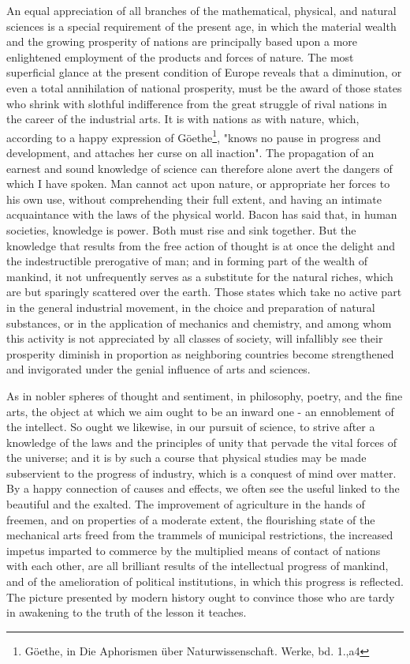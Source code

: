 An equal appreciation of all branches of the mathematical, physical, and natural sciences is a special requirement of the present age, in which the material wealth and the growing prosperity of nations are principally based upon a more enlightened employment of the products and forces of nature. The most superficial glance at the present condition of Europe reveals that a diminution, or even a total annihilation of national prosperity, must be the award of those states who shrink with slothful indifference from the great struggle of rival nations in the career of the industrial arts. It is with nations as with nature, which, according to a happy expression of G\"oethe\footnote{G\"oethe, in Die Aphorismen über Naturwissenschaft. Werke, bd. 1.,a4}, "knows no pause in progress and development, and attaches her curse on all inaction". The propagation of an earnest and sound knowledge of science can therefore alone avert the dangers of which I have spoken. Man cannot act upon nature, or appropriate her forces to his own use, without comprehending their full extent, and having an intimate acquaintance with the laws of the physical world. Bacon has said that, in human societies, knowledge is power. Both must rise and sink together. But the knowledge that results from the free action of thought is at once the delight and the indestructible prerogative of man; and in forming part of the wealth of mankind, it not unfrequently serves as a substitute for the natural riches, which are but sparingly scattered over the earth. Those states which take no active part in the general industrial movement, in the choice and preparation of natural substances, or in the application of mechanics and chemistry, and among whom this activity is not appreciated by all classes of society, will infallibly see their prosperity diminish in proportion as neighboring countries become strengthened and invigorated under the genial influence of arts and sciences.

As in nobler spheres of thought and sentiment, in philosophy, poetry, and the fine arts, the object at which we aim ought to be an inward one - an ennoblement of the intellect. So ought we likewise, in our pursuit of science, to strive after a knowledge of the laws and the principles of unity that pervade the vital forces of the universe; and it is by such a course that physical studies may be made subservient to the progress of industry, which is a conquest of mind over matter. By a happy connection of causes and effects, we often see the useful linked to the beautiful and the exalted. The improvement of agriculture in the hands of freemen, and on properties of a moderate extent, the flourishing state of the mechanical arts freed from the trammels of municipal restrictions, the increased impetus imparted to commerce by the multiplied means of contact of nations with each other, are all brilliant results of the intellectual progress of mankind, and of the amelioration of political institutions, in which this progress is reflected. The picture presented by modern history ought to convince those who are tardy in awakening to the truth of the lesson it teaches.

